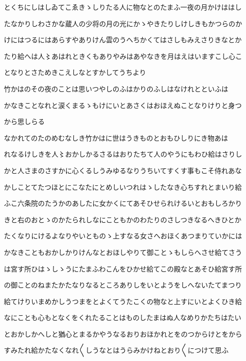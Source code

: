 \documentclass[a4paper,11pt,landscape]{ltjtarticle}
\begin{document}
とくちにしはしゐてこゑきゝしりたる人に物なとのたまふ一夜の月かけははし
\par\medskip
たなかりしわさかな蔵人の少将の月の光にかゝやきたりしけしきもかつらのか
\par\medskip
けにはつるにはあらすやありけん雲のうへちかくてはさしもみえさりきなとか
\par\medskip
たり給へは人〻あはれときくもありやみはあやなきを月はえはいますこし心こ
\par\medskip
となりとさためきこえしなとすかしてうちより
\par\medskip
竹かはのその夜のことは思いつやしのふはかりのふしはなけれとといふは
\par\medskip
かなきことなれと涙くまるゝもけにいとあさくはおほえぬことなりけりと身つ
\par\medskip
から思しらる
\par\medskip
なかれてのたのめむなしき竹かはに世はうきものとおもひしりにき物あは
\par\medskip
れなるけしきを人〻おかしかるさるはおりたちて人のやうにもわひ給はさりし
\par\medskip
かと人さまのさすかに心くるしうみゆるなりうちいてすくす事もこそ侍れあな
\par\medskip
かしことてたつほとにこなたにとめしいつれはゝしたなき心ちすれとまいり給
\par\medskip
ふこ六条院のたうかのあしたに女かくにてあそひせられけるいとおもしろかり
\par\medskip
きと右のおとゝのかたられしなにこともかのわたりのさしつきなるへきひとか
\par\medskip
たくなりにけるよなりやいとものゝ上すなる女さへおほくあつまりていかには
\par\medskip
かなきこともおかしかりけんなとおほしやりて御ことゝもしらへさせ給てさう
\par\medskip
は宮す所ひはゝしゝうにたまふわこんをひかせ給てこの殿なとあそひ給宮す所
\par\medskip
の御ことのねまたかたなりなるところありしをいとようをしへないたてまつり
\par\medskip
給てけりいまめかしうつまをとよくてうたこくの物なと上すにいとよくひき給
\par\medskip
なにことも心もとなくをくれたることはものしたまはぬ人なめりかたちはたい
\par\medskip
とおかしかへしと猶心とまるかやうなるおりおほかれとをのつからけとをから
\par\medskip
すみたれ給かたなくなれ〱しうなとはうらみかけねとおり〱につけて思ふ
\par\medskip
\end{document}
